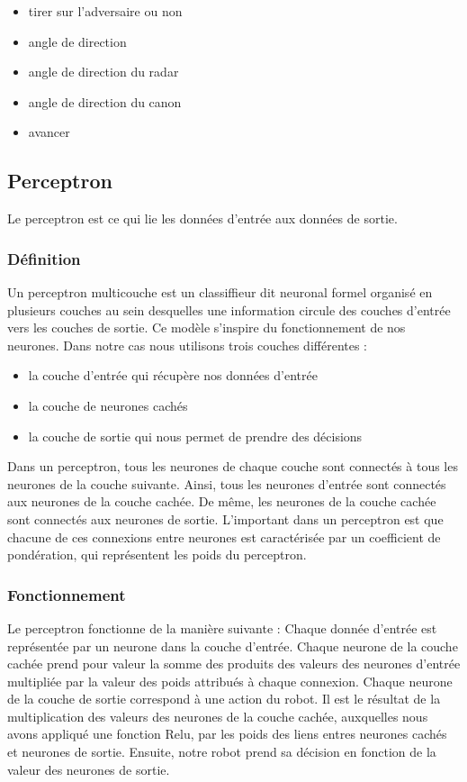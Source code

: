 \documentclass[12pt]{article}
\begin{document}
\begin{itemize}
\item tirer sur l'adversaire ou non
\item angle de direction
\item angle de direction du radar
\item angle de direction du canon
\item avancer
\end{itemize}

\subsection{Perceptron}
Le perceptron est ce qui lie les données d'entrée aux données de sortie.

\subsubsection{Définition}
Un perceptron multicouche est un classiffieur dit neuronal formel organisé en
plusieurs couches au sein desquelles une information circule des couches d'entrée
vers les couches de sortie. Ce modèle s'inspire du fonctionnement de nos neurones.
Dans notre cas nous utilisons trois couches différentes :

\begin{itemize}
\item la couche d'entrée qui récupère nos données d'entrée
\item la couche de neurones cachés
\item la couche de sortie qui nous permet de prendre des décisions
\end{itemize}

Dans un perceptron, tous les neurones de chaque couche sont connectés à tous les
neurones de la couche suivante. Ainsi, tous les neurones d'entrée sont connectés
aux neurones de la couche cachée. De même, les neurones de la couche cachée sont
connectés aux neurones de sortie. L'important dans un perceptron est que chacune
de ces connexions entre neurones est caractérisée par un coefficient de pondération,
qui représentent les poids du perceptron. 

\subsubsection{Fonctionnement}
Le perceptron fonctionne de la manière suivante :
Chaque donnée d'entrée est représentée par un neurone dans la couche d'entrée.
Chaque neurone de la couche cachée prend pour valeur la somme des produits des
valeurs des neurones d'entrée multipliée par la valeur des poids attribués à chaque
connexion.
Chaque neurone de la couche de sortie correspond à une action du robot. Il est le
résultat de la multiplication des valeurs des neurones de la couche cachée, auxquelles
nous avons appliqué une fonction Relu, par les poids des liens entres neurones cachés
et neurones de sortie.
Ensuite, notre robot prend sa décision en fonction de la valeur des neurones de sortie.
\end{document}
